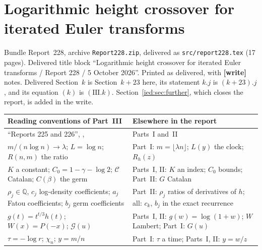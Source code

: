 \documentclass[11pt,letterpaper]{article}
\theoremstyle{remark}\newtheorem{remark}[theorem]{Remark}
\newcommand{\file}[1]{\nolinkurl{#1}}
\newcommand{\partsource}[1]{\par\noindent\begin{minipage}{\textwidth}\small #1\end{minipage}\par\medskip}
\newcommand{\parteqs}[1]{\setcounter{equation}{0}%
 \renewcommand{\theequation}{#1\arabic{equation}}%
 \renewcommand{\theHequation}{#1\arabic{equation}}}
\begin{document}
\part{Logarithmic height crossover for iterated Euler transforms}\label{ied:log:part}
\parteqs{III.}
\partsource{Bundle Report~228, archive \file{Report228.zip}, delivered as \file{src/report228.tex} (17 pages). Delivered title block ``Logarithmic height crossover for iterated Euler transforms / Report 228 / 5 October 2026''. Printed as delivered, with \textbf{[write]} notes. Delivered Section~$k$ is Section~$k+23$ here, its statement $k.j$ is $(k+23).j$, and its equation $(k)$ is $(\mathrm{III}.k)$. Section~\ref{ied:sec:further}, which closes the report, is added in the write.}
\begin{center}
\small
\begin{tabular}{@{}>{\raggedright\arraybackslash}p{} >{\raggedright\arraybackslash}p{}@{}}
\toprule
Reading conventions of Part~III & Elsewhere in the report\\
\midrule
``Reports 225 and 226'', \cite{R225}, \cite{R226} & Parts~I and~II\\
$m/(n\log n)\to\lambda$; $L=\log n$; $R(n,m)$ the ratio & Part~I: $m=\lfloor\lambda n\rfloor$; $L(y)$ the clock; $R_h(z)$\\
$K$ a constant; $C_0=1-\gamma-\log2$; $\mathcal C$ Catalan; $C(\beta)$ the germ & Parts~I, II: $K$ an index; $C_0$ bounds; Part~II: $G$ Catalan\\
$\rho_j\in\mathbb Q$, $c_j$ log-density coefficients; $a_j$ Fatou coefficients; $b_j$ germ coefficients & Part~II: $\rho_j$ ratios of derivatives of $h$; all: $c_k$, $b_j$ in the exact recurrence\\
$g(t)=t^{t/3}h(t)$; $W(x)=P(-x)$; $\mathcal G(u)$ & Parts~I, II: $g(w)=\log(1+w)$; $W$ Lambert; Part~I: $G(u)$\\
$\tau=-\log r$; $\chi_n$; $y=m/n$ & Part~I: $\tau$ a time; Parts~I, II: $y=w/z$\\
\bottomrule
\end{tabular}
\end{center}
\end{document}
